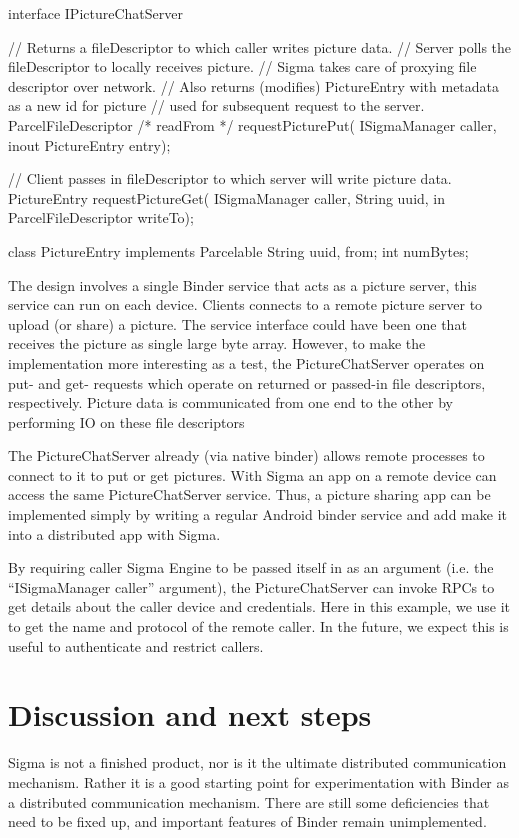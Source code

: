 \documentclass[prodmode]{acmlarge}
\begin{document}
\begin{snippet}
interface IPictureChatServer {
  // Returns a fileDescriptor to which caller writes picture data.
  // Server polls the fileDescriptor to locally receives picture.
  // Sigma takes care of proxying file descriptor over network.
  // Also returns (modifies) PictureEntry with metadata as a new id for picture
  // used for subsequent request to the server.
  ParcelFileDescriptor /* readFrom */ requestPicturePut(
    ISigmaManager caller, inout PictureEntry entry);

  // Client passes in fileDescriptor to which server will write picture data.
  PictureEntry requestPictureGet(
    ISigmaManager caller, String uuid, in ParcelFileDescriptor writeTo);
}

class PictureEntry implements Parcelable {
    String uuid, from;
    int numBytes;
}
\end{snippet}

The design involves a single Binder service that acts as a picture server, this service can run on each device. Clients connects to a remote picture server to upload (or share) a picture. The service interface could have been one that receives the picture as single large byte array. However, to make the implementation more interesting as a test, the PictureChatServer operates on put- and get- requests which operate on returned or passed-in file descriptors, respectively. Picture data is communicated from one end to the other by performing IO on these file descriptors

The PictureChatServer already (via native binder) allows remote processes to connect to it to put or get pictures. With Sigma an app on a remote device can access the same PictureChatServer service. Thus, a picture sharing app can be implemented simply by writing a regular Android binder service and add make it into a distributed app with Sigma.

By requiring caller Sigma Engine to be passed itself in as an argument (i.e. the ``ISigmaManager caller'' argument), the PictureChatServer can invoke RPCs to get details about the caller device and credentials. Here in this example, we use it to get the name and protocol of the remote caller. In the future, we expect this is useful to authenticate and restrict callers.

\section{Discussion and next steps}
\label{sec:Discussion}
Sigma is not a finished product, nor is it the ultimate distributed communication mechanism. Rather it is a good starting point for experimentation with Binder as a distributed communication mechanism. There are still some deficiencies that need to be fixed up, and important features of Binder remain unimplemented.
\end{document}
